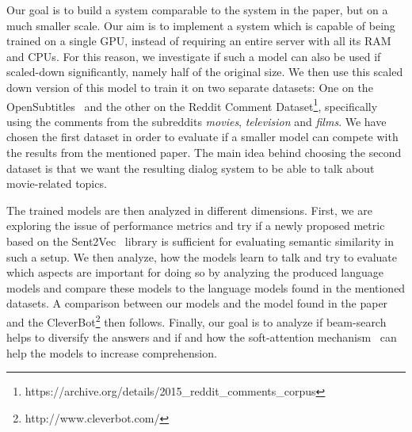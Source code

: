 Our goal is to build a system comparable to the system in the paper, but on a much smaller scale. Our aim is to implement a system which is capable of being trained on a single GPU, instead of requiring an entire server with all its RAM and CPUs. For this reason, we investigate if such a model can also be used if scaled-down significantly, namely half of the original size. We then use this scaled down version of this model to train it on two separate datasets: One on the OpenSubtitles~\cite{Lison:2016} and the other on the Reddit Comment Dataset\footnote{https://archive.org/details/2015\_reddit\_comments\_corpus}, specifically using the comments from the subreddits \emph{movies}, \emph{television} and \emph{films}. We have chosen the first dataset in order to evaluate if a smaller model can compete with the results from the mentioned paper. The main idea behind choosing the second dataset is that we want the resulting dialog system to be able to talk about movie-related topics.

The trained models are then analyzed in different dimensions. First, we are exploring the issue of performance metrics and try if a newly proposed metric based on the Sent2Vec~\cite{Pgj:2017} library is sufficient for evaluating semantic similarity in such a setup. We then analyze, how the models learn to talk and try to evaluate which aspects are important for doing so by analyzing the produced language models and compare these models to the language models found in the mentioned datasets. A comparison between our models and the model found in the paper and the CleverBot\footnote{http://www.cleverbot.com/} then follows. Finally, our goal is to analyze if beam-search helps to diversify the answers and if and how the soft-attention mechanism~\cite{Bahdanau:2014} can help the models to increase comprehension.